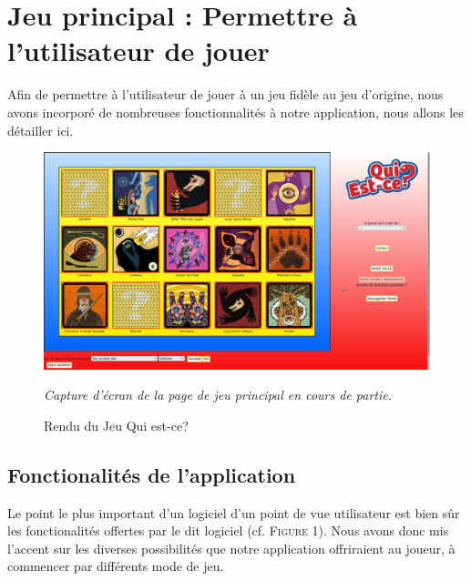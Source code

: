 \documentclass{article}
\begin{document}
    \section{Jeu principal : Permettre à l'utilisateur de jouer}
        \vspace{0.5cm}
        Afin de permettre à l'utilisateur de jouer à un jeu fidèle au jeu d'origine, nous avons incorporé de nombreuses fonctionnalités à notre application, nous allons les détailler ici.
        \begin{figure}[h]
            \centering
            \includegraphics[width=13.5cm]{images/CaptureJeuQuiEstCe.png}
            \caption{Rendu du Jeu \textsf{Qui est-ce?}}
            \textit{Capture d'écran de la page de jeu principal en cours de partie.}
        \end{figure}
        
        \subsection{Fonctionalités de l'application}
            Le point le plus important d'un logiciel d'un point de vue utilisateur est bien sûr les fonctionalités offertes par le dit logiciel (cf. \textsc{Figure 1}). Nous avons donc mis l'accent sur les diverses possibilités que notre application offriraient au joueur, à commencer par différents mode de jeu.
            
\end{document}
